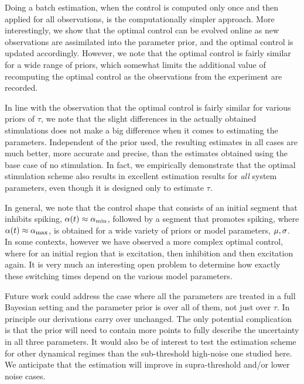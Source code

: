 Doing a batch estimation, when the control is computed only once and then
applied for all observations, is the computationally simpler approach. More
interestingly, we show that the optimal control can be evolved online as
new observations are assimilated into the parameter prior, and the optimal
control is updated accordingly. However, we note that the optimal control is
fairly similar for a wide range of priors, which somewhat limits the
additional value of recomputing the optimal control as the observations from
the experiment are recorded.

In line with the observation that the optimal control is fairly similar for
various priors of $\tau$, we note that the slight differences in the actually
obtained stimulations does not make a big difference when it comes to estimating
the parameters. Independent of the prior used, the resulting
estimates in all cases are much better, more accurate and precise, than the
estimates obtained using the base case of no stimulation. 
In fact, we empirically demonstrate that the optimal stimulation scheme also
results in excellent estimation results for {\sl all} system parameters, even
though it is designed only to estimate $\tau$.

In general, we note that the control shape that consists of an initial segment
that inhibits spiking, $\alpha(t) \approx { \alpha_{\textrm{min}} }$, followed by a segment that
promotes spiking, where $\alpha(t) \approx { \alpha_{\textrm{max}} }$, is obtained for a wide variety of
priors or model parameters, ${\mu }, \sigma$. In some contexts, however we have observed
a more complex optimal control, where  for an initial region that is excitation,
then inhibition and then excitation again. It is very much an interesting open
problem to determine how exactly these switching times depend on the various
model parameters.

Future work could address the case where all the parameters are treated
in a full Bayesian setting and the parameter prior is over all of them, not just
over $\tau$. In principle our derivations carry over unchanged. The only potential 
complication is that the prior will need to contain more points to fully
describe the uncertainty in all three parameters. It would also be of interest to test the estimation scheme 
for other dynamical regimes than the sub-threshold high-noise one studied here. We anticipate that
the estimation will improve in supra-threshold and/or lower noise cases. 

